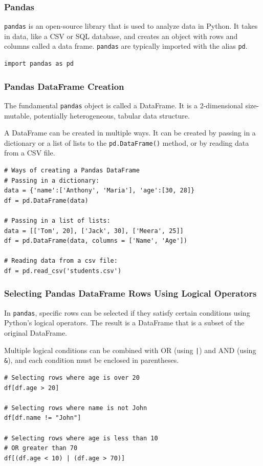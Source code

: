 \documentclass[a4paper]{article}
\begin{document}
\subsubsection{Pandas}
\texttt{pandas} is an open-source library that is used to analyze data in Python. It takes in data, like a CSV or SQL database, and creates an object with rows and columns called a data frame. \texttt{pandas} are typically imported with the alias \texttt{pd}.

\begin{lstlisting}
import pandas as pd
\end{lstlisting}{}

\subsubsection{Pandas DataFrame Creation}
The fundamental \texttt{pandas} object is called a DataFrame. It is a 2-dimensional size-mutable, potentially heterogeneous, tabular data structure.

A DataFrame can be created in multiple ways. It can be created by passing in a dictionary or a list of lists to the \texttt{pd.DataFrame()} method, or by reading data from a CSV file.

\begin{lstlisting}
# Ways of creating a Pandas DataFrame
# Passing in a dictionary:
data = {'name':['Anthony', 'Maria'], 'age':[30, 28]}
df = pd.DataFrame(data)

# Passing in a list of lists:
data = [['Tom', 20], ['Jack', 30], ['Meera', 25]]
df = pd.DataFrame(data, columns = ['Name', 'Age'])

# Reading data from a csv file:
df = pd.read_csv('students.csv')
\end{lstlisting}{}

\subsubsection{Selecting Pandas DataFrame Rows Using Logical Operators}
In \texttt{pandas}, specific rows can be selected if they satisfy certain conditions using Python’s logical operators. The result is a DataFrame that is a subset of the original DataFrame.

Multiple logical conditions can be combined with OR (using \texttt{|}) and AND (using \texttt{\&}), and each condition must be enclosed in parentheses.

\begin{lstlisting}
# Selecting rows where age is over 20
df[df.age > 20]

# Selecting rows where name is not John
df[df.name != "John"]

# Selecting rows where age is less than 10
# OR greater than 70
df[(df.age < 10) | (df.age > 70)]
\end{lstlisting}{}
\end{document}
